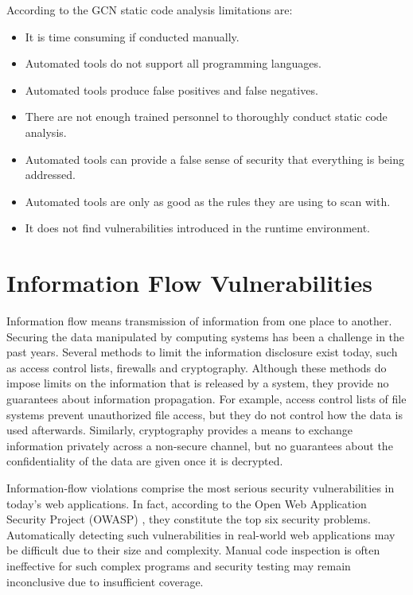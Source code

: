 According to the GCN \cite{ref_87_gcn:gcn} static code analysis limitations are:
\begin{itemize}
	\item It is time consuming if conducted manually.
	\item Automated tools do not support all programming languages.
	\item Automated tools produce false positives and false negatives.
	\item There are not enough trained personnel to thoroughly conduct static code analysis.
	\item Automated tools can provide a false sense of security that everything is being addressed.
	\item Automated tools are only as good as the rules they are using to scan with.
	\item It does not find vulnerabilities introduced in the runtime environment.
\end{itemize}

\section{Information Flow Vulnerabilities}

Information flow means  transmission of information from one place to another. Securing the data manipulated by computing systems has been a challenge in the past years. Several methods to limit the information disclosure exist today, such as access control lists, firewalls and cryptography. Although these methods do impose limits on the information that is released by a system, they provide no guarantees about information propagation. For example, access control lists of file systems prevent unauthorized file access, but they do not control how the data is used afterwards. Similarly, cryptography provides a means to exchange information privately across a non-secure channel, but no guarantees about the confidentiality of the data are given once it is decrypted.

Information-flow violations \cite{ref_103_denning1977certification} comprise the most serious security
vulnerabilities in today's web applications. In fact, according to
the Open Web Application Security Project (OWASP) \cite{ref_104_owasp:owasp}, they
constitute the top six security problems. Automatically detecting
such vulnerabilities in real-world web applications may be difficult
due to their size and complexity. Manual code inspection is often
ineffective for such complex programs and security testing may
remain inconclusive due to insufficient coverage.

